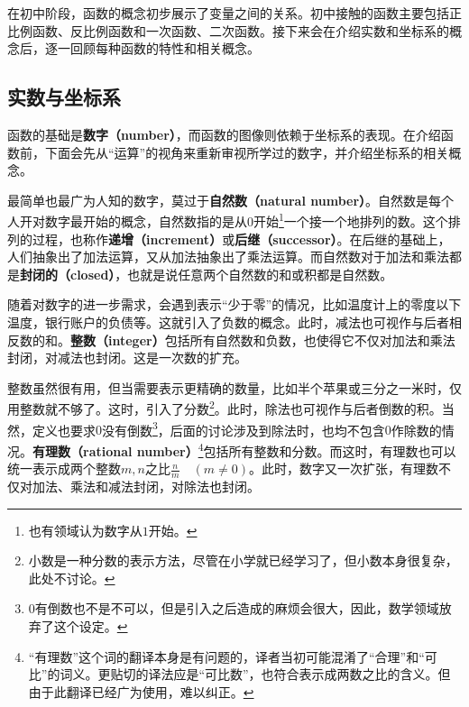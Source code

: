 
\begin{issues}
\issueDraft
\end{issues}

在初中阶段，函数的概念初步展示了变量之间的关系。初中接触的函数主要包括正比例函数、反比例函数和一次函数、二次函数。接下来会在介绍实数和坐标系的概念后，逐一回顾每种函数的特性和相关概念。

\subsection{实数与坐标系}

函数的基础是\textbf{数字（number）}，而函数的图像则依赖于坐标系的表现。在介绍函数前，下面会先从“运算”的视角来重新审视所学过的数字，并介绍坐标系的相关概念。

最简单也最广为人知的数字，莫过于\textbf{自然数（natural number）}。自然数是每个人开对数字最开始的概念，自然数指的是从$0$开始\footnote{也有领域认为数字从$1$开始。}一个接一个地排列的数。这个排列的过程，也称作\textbf{递增（increment）}或\textbf{后继（successor）}。在后继的基础上，人们抽象出了加法运算，又从加法抽象出了乘法运算。而自然数对于加法和乘法都是\textbf{封闭的（closed）}，也就是说任意两个自然数的和或积都是自然数。

随着对数字的进一步需求，会遇到表示“少于零”的情况，比如温度计上的零度以下温度，银行账户的负债等。这就引入了负数的概念。此时，减法也可视作与后者相反数的和。\textbf{整数（integer）}包括所有自然数和负数，也使得它不仅对加法和乘法封闭，对减法也封闭。这是一次数的扩充。

整数虽然很有用，但当需要表示更精确的数量，比如半个苹果或三分之一米时，仅用整数就不够了。这时，引入了分数\footnote{小数是一种分数的表示方法，尽管在小学就已经学习了，但小数本身很复杂，此处不讨论。}。此时，除法也可视作与后者倒数的积。当然，定义也要求$0$没有倒数\footnote{$0$有倒数也不是不可以，但是引入之后造成的麻烦会很大，因此，数学领域放弃了这个设定。}，后面的讨论涉及到除法时，也均不包含$0$作除数的情况。\textbf{有理数（rational number）}\footnote{“有理数”这个词的翻译本身是有问题的，译者当初可能混淆了“合理”和“可比”的词义。更贴切的译法应是“可比数”，也符合表示成两数之比的含义。但由于此翻译已经广为使用，难以纠正。}包括所有整数和分数。而这时，有理数也可以统一表示成两个整数$m,n$之比$\displaystyle\frac{n}{m}\quad(m \neq 0)$。此时，数字又一次扩张，有理数不仅对加法、乘法和减法封闭，对除法也封闭。

